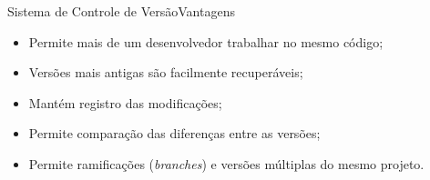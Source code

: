 
\frame{\maketitle}

\begin{frame}{Sistema de Controle de Versão}{Vantagens}
\begin{itemize}[<+-| alert@+>]
\item Permite mais de um desenvolvedor trabalhar no mesmo código;
\item Versões mais antigas são facilmente recuperáveis;
\item Mantém registro das modificações;
\item Permite comparação das diferenças entre as versões;
\item Permite ramificações ({\em branches}) e versões múltiplas 
      do mesmo projeto.
\end{itemize}
\end{frame}

